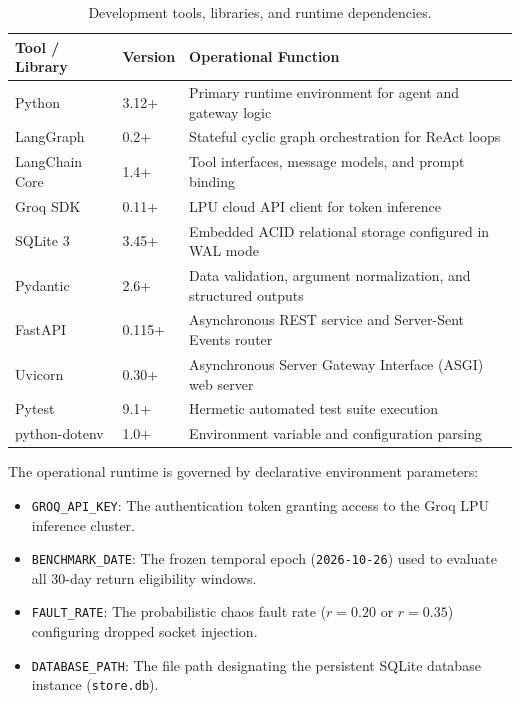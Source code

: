 \begin{table}[H]
\centering
\small
\renewcommand{\arraystretch}{1.25}
\begin{tabular}{|p{3.2cm}|p{2.2cm}|p{8.0cm}|}
\hline
\rowcolor{gray!15}
\textbf{Tool / Library} & \textbf{Version} & \textbf{Operational Function} \\
\hline
Python & 3.12+ & Primary runtime environment for agent and gateway logic \\
\hline
LangGraph & 0.2+ & Stateful cyclic graph orchestration for ReAct loops \\
\hline
LangChain Core & 1.4+ & Tool interfaces, message models, and prompt binding \\
\hline
Groq SDK & 0.11+ & LPU cloud API client for token inference \\
\hline
SQLite 3 & 3.45+ & Embedded ACID relational storage configured in WAL mode \\
\hline
Pydantic & 2.6+ & Data validation, argument normalization, and structured outputs \\
\hline
FastAPI & 0.115+ & Asynchronous REST service and Server-Sent Events router \\
\hline
Uvicorn & 0.30+ & Asynchronous Server Gateway Interface (ASGI) web server \\
\hline
Pytest & 9.1+ & Hermetic automated test suite execution \\
\hline
python-dotenv & 1.0+ & Environment variable and configuration parsing \\
\hline
\end{tabular}
\caption{Development tools, libraries, and runtime dependencies.}
\label{tab:tools}
\end{table}

The operational runtime is governed by declarative environment parameters:
\begin{itemize}
    \item \texttt{GROQ\_API\_KEY}: The authentication token granting access to the Groq LPU inference cluster.
    \item \texttt{BENCHMARK\_DATE}: The frozen temporal epoch (\texttt{2026-10-26}) used to evaluate all 30-day return eligibility windows.
    \item \texttt{FAULT\_RATE}: The probabilistic chaos fault rate ($r = 0.20$ or $r = 0.35$) configuring dropped socket injection.
    \item \texttt{DATABASE\_PATH}: The file path designating the persistent SQLite database instance (\texttt{store.db}).
\end{itemize}

